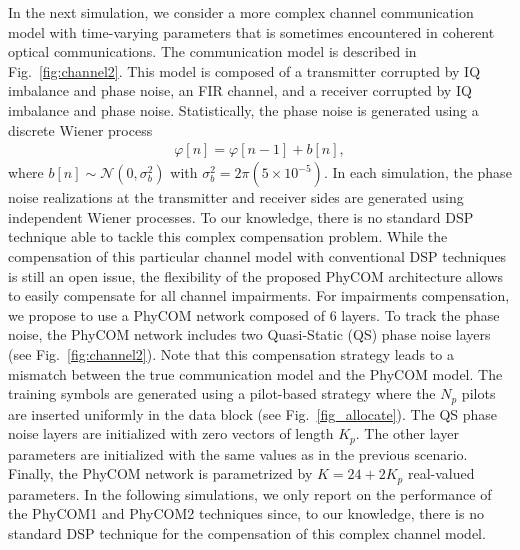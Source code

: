 \documentclass{article}
\begin{document}
\begin{figure*}[!t]
\caption{Communication Model with PhyCOM model mismatch. The physical layer is composed of a transmitter with IQ impairment ($\boldsymbol \theta_1=[0.9,0.4,-0.4,0.6]^T$) and Wiener phase noise, a FIR channel composed of $8$ taps ($\mathbf{h}=[0.9+0.1j,0.3+0.3j,0.1+0.05j,0.02+0.1j,0.1-0.05j,0.02-0.1j,0.1+0.03j,0.04-0.012j]^T$), and a receiver with IQ impairment ($\boldsymbol \theta=[1.8,0.1,0.13,0.8]^T$) and Wiener phase noise. The noise layer add a circular white Gaussian noise $\mathcal{N}_{\mathcal{C}}(0,\sigma^2)$.}\label{fig:channel2}
\end{figure*}

In the next simulation, we consider a more complex channel communication model with time-varying parameters that is sometimes encountered in coherent optical communications. The communication model is described in Fig.~\ref{fig:channel2}. This model is composed of a transmitter corrupted by IQ imbalance and phase noise, an FIR channel, and a receiver corrupted by IQ imbalance and phase noise. Statistically, the phase noise is generated using a discrete Wiener process
\begin{align}
\varphi[n] = \varphi[n-1]+b[n],
\end{align}
where $b[n]\sim \mathcal{N}(0,\sigma^2_b)$ with $\sigma^2_b=2\pi (5\times 10^{-5})$. In each simulation, the phase noise realizations at the transmitter and receiver sides are generated using independent Wiener processes. To our knowledge, there is no standard DSP technique able to tackle this complex compensation problem. While the compensation of this particular channel model with conventional DSP techniques is still an open issue, the flexibility of the proposed PhyCOM architecture allows to easily compensate for all channel impairments.
For impairments compensation, we propose to use a PhyCOM network composed of 6 layers. To track the phase noise, the PhyCOM network includes two Quasi-Static (QS) phase noise layers (see Fig.~\ref{fig:channel2}). Note that this compensation strategy leads to a mismatch between the true communication model and the PhyCOM model. The training symbols are generated using a pilot-based strategy where the $N_p$ pilots are inserted uniformly in the data block (see Fig.~\ref{fig_allocate}). The QS phase noise layers are initialized with zero vectors of length $K_p$. The other layer parameters are initialized with the same values as in the previous scenario. Finally, the PhyCOM network is parametrized by $K=24+2K_p$ real-valued parameters. In the following simulations, we only report on the performance of the PhyCOM1 and PhyCOM2 techniques since, to our knowledge, there is no standard DSP technique for the compensation of this complex channel model.  
\end{document}
